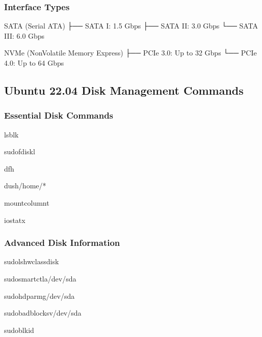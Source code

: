 \documentclass[letterpaper,10pt,english]{sphinxmanual}
\begin{document}
\subsubsection{Interface Types}
\label{\detokenize{disk-management:interface-types}}
\begin{sphinxVerbatim}[commandchars=\\\{\}]
SATA (Serial ATA)
├── SATA I: 1.5 Gbps
├── SATA II: 3.0 Gbps
└── SATA III: 6.0 Gbps

NVMe (Non\PYGZhy{}Volatile Memory Express)
├── PCIe 3.0: Up to 32 Gbps
└── PCIe 4.0: Up to 64 Gbps
\end{sphinxVerbatim}


\subsection{Ubuntu 22.04 Disk Management Commands}
\label{\detokenize{disk-management:ubuntu-22-04-disk-management-commands}}

\subsubsection{Essential Disk Commands}
\label{\detokenize{disk-management:essential-disk-commands}}
\begin{sphinxVerbatim}[commandchars=\\\{\}]
lsblk

sudofdisk\PYGZhy{}l

df\PYGZhy{}h

du\PYGZhy{}sh/home/*

mountcolumn\PYGZhy{}t

iostat\PYGZhy{}x
\end{sphinxVerbatim}


\subsubsection{Advanced Disk Information}
\label{\detokenize{disk-management:advanced-disk-information}}
\begin{sphinxVerbatim}[commandchars=\\\{\}]
sudolshw\PYGZhy{}classdisk

sudosmartctl\PYGZhy{}a/dev/sda

sudohdparm\PYGZhy{}g/dev/sda

sudobadblocks\PYGZhy{}v/dev/sda

sudoblkid
\end{sphinxVerbatim}
\end{document}
